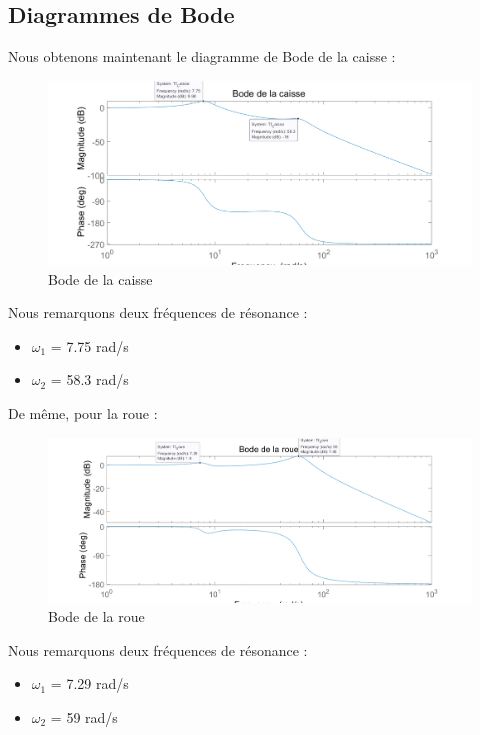 \documentclass[a4paper,12pt]{insa} %
\begin{document}
\subsection{Diagrammes de Bode}
Nous obtenons maintenant le diagramme de Bode de la caisse : 
\begin{center}
    \begin{figure}[H]
        \centering
        \includegraphics[width=13cm, keepaspectratio]{figures/bode_caisse.png}
        \caption{Bode de la caisse}
        \label{Bode de la caisse}
    \end{figure}
\end{center}
Nous remarquons deux fréquences de résonance : 
\begin{itemize}
\item $\omega_1$ = 7.75 rad/s
\item $\omega_2$ = 58.3 rad/s
\end{itemize}
De même, pour la roue : 
\begin{center}
    \begin{figure}[H]
        \centering
        \includegraphics[width=13cm, keepaspectratio]{figures/bode_roue.png}
        \caption{Bode de la roue}
        \label{Bode de la roue}
    \end{figure}
\end{center}

Nous remarquons deux fréquences de résonance : 
\begin{itemize}
\item $\omega_1$ = 7.29 rad/s
\item $\omega_2$ = 59 rad/s
\end{itemize}
\end{document}
